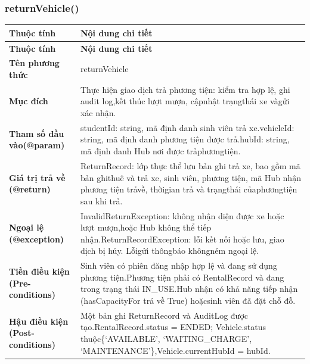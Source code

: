 \subsubsection{returnVehicle()}
\begin{longtable}{|L{0.24\textwidth}|L{0.70\textwidth}|}
\hline
\textbf{Thuộc tính} & \textbf{Nội dung chi tiết} \\
\hline
\endfirsthead
\hline
\textbf{Thuộc tính} & \textbf{Nội dung chi tiết} \\
\hline
\endhead
\textbf{Tên phương thức} & returnVehicle \\
\hline
\textbf{Mục đích} & Thực hiện giao dịch trả phương tiện: kiểm tra hợp lệ, ghi audit log,\newline kết thúc lượt mượn, cậpnhật trạngthái xe vàgửi xác nhận. \\
\hline
\textbf{Tham số đầu vào}\newline \textbf{(@param)} & studentId: string, mã định danh sinh viên trả xe.\newline vehicleId: string, mã định danh phương tiện được trả.\newline hubId: string, mã định danh Hub nơi được trảphươngtiện. \\
\hline
\textbf{Giá trị trả về (@return)} & ReturnRecord: lớp thực thể lưu bản ghi trả xe, bao gồm mã bản ghi\newline thuê và trả xe, sinh viên, phương tiện, mã Hub nhận phương tiện trả\newline về, thờigian trả và trạngthái củaphươngtiện sau khi trả. \\
\hline
\textbf{Ngoại lệ (@exception)} & InvalidReturnException: không nhận diện được xe hoặc lượt mượn,\newline hoặc Hub không thể tiếp nhận.\newline ReturnRecordException: lỗi kết nối hoặc lưu, giao dịch bị hủy. Lỗi\newline gửi thôngbáo khôngném ngoại lệ. \\
\hline
\textbf{Tiền điều kiện (Pre-}\newline \textbf{conditions)} & Sinh viên có phiên đăng nhập hợp lệ và đang sử dụng phương tiện.\newline Phương tiện phải có RentalRecord và đang trong trạng thái IN\_USE.\newline Hub nhận có khả năng tiếp nhận (hasCapacityFor trả về True) hoặc\newline sinh viên đã đặt chỗ đỗ. \\
\hline
\textbf{Hậu điều kiện (Post-}\newline \textbf{conditions)} & Một bản ghi ReturnRecord và AuditLog được tạo.\newline RentalRecord.status = ENDED; Vehicle.status thuộc\newline \{‘AVAILABLE’, ‘WAITING\_CHARGE’, ‘MAINTENANCE’\},\newline Vehicle.currentHubId = hubId. \\
\hline
\end{longtable}
